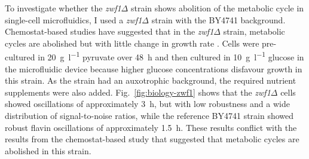 To investigate whether the \textit{zwf1$\Delta$} strain shows abolition of the metabolic cycle in single-cell microfluidics, I used a \textit{zwf1$\Delta$} strain with the BY4741 background.
Chemostat-based studies have suggested that in the \textit{zwf1$\Delta$} strain, metabolic cycles are abolished but with little change in growth rate \parencite{tuCyclicChangesMetabolic2007}.
Cells were pre-cultured in \SI{20}{\gram~\litre^{-1}} pyruvate over \SI{48}{\hour} and then cultured in \SI{10}{\gram~\litre^{-1}} glucose in the microfluidic device because higher glucose concentrations disfavour growth in this strain.
As the strain had an auxotrophic background, the required nutrient supplements were also added.
%
Fig.\ \ref{fig:biology-zwf1} shows that the \textit{zwf1$\Delta$} cells showed oscillations of approximately \SI{3}{\hour}, but with low robustness and a wide distribution of signal-to-noise ratios, while the reference BY4741 strain showed robust flavin oscillations of approximately \SI{1.5}{\hour}.
These results conflict with the results from the chemostat-based study \parencite{tuCyclicChangesMetabolic2007} that suggested that metabolic cycles are abolished in this strain.


